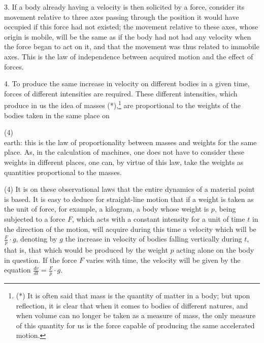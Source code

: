 \documentclass{book}
\begin{document}
3. If a body already having a velocity is then solicited by a force, consider its movement relative to three axes passing through the position it would have occupied if this force had not existed; the movement relative to these axes, whose origin is mobile, will be the same as if the body had not had any velocity when the force began to act on it, and that the movement was thus related to immobile axes. This is the law of independence between acquired motion and the effect of forces.

4. To produce the same increase in velocity on different bodies in a given time, forces of different intensities are required. These different intensities, which produce in us the idea of masses (*),\footnote{(*) It is often said that mass is the quantity of matter in a body; but upon reflection, it is clear that when it comes to bodies of different natures, and when volume can no longer be taken as a measure of mass, the only measure of this quantity for us is the force capable of producing the same accelerated motion.} are proportional to the weights of the bodies taken in the same place on



\newpage
(4) \\

earth: this is the law of proportionality between masses and weights for the same place. As, in the calculation of machines, one does not have to consider these weights in different places, one can, by virtue of this law, take the weights as quantities proportional to the masses.

 (4) It is on these observational laws that the entire dynamics of a material point is based. It is easy to deduce for straight-line motion that if a weight is taken as the unit of force, for example, a kilogram, a body whose weight is \(p\), being subjected to a force \(F\), which acts with a constant intensity for a unit of time 
\(t\) in the direction of the motion, will acquire during this time a velocity which will be \(\frac{F}{p} \cdot g\), denoting by \(g\) the increase in velocity of bodies falling vertically during \(t\),
that is, that which would be produced by the weight \(p\) acting alone on the body in question. If the force \(F\) varies with time, the velocity will be given by the equation \(\frac{dv}{dt} = \frac{F}{p} \cdot g\).
\end{document}
